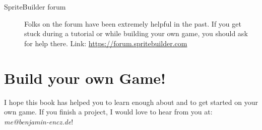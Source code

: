 \begin{description}
\item[SpriteBuilder forum] Folks on the \SB{} forum have been extremely helpful
in the past. If you get stuck during a tutorial or while building your own
game, you should ask for help there. Link:
\url{https://forum.spritebuilder.com}
\end{description}

\section{Build your own Game!}
I hope this book has helped you to learn enough about \SB{} and \cocos{} to get
started on your own game. If you finish a project, I would love to hear from
you at: \textit{me@benjamin-encz.de}!
